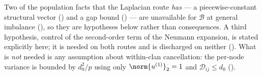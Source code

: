 %
\providecommand{\Dmat}{\mathcal{D}}      %
\providecommand{\Bop}{\mathcal{B}}       %
\providecommand{\uone}{u^{(1)}}          %
\providecommand{\huone}{\hat u^{(1)}}
\providecommand{\DlamB}{\Delta\lambda^{(\Bop)}}

Two of the population facts that the Laplacian route \emph{has} --- a
piecewise-constant structural vector () and a gap bound
() --- are unavailable for $\Bop$ at general imbalance
(), so they are hypotheses below rather than consequences.
A third hypothesis, control of the second-order term of the Neumann expansion, is
stated explicitly here; it is needed on both routes and is discharged on neither
(). What is \emph{not} needed is any assumption about
within-clan cancellation: the per-node variance is bounded by $d_0^2/p$ using only
$\norm{\uone}_2=1$ and $\Dmat_{ij}\le d_0$ ().

